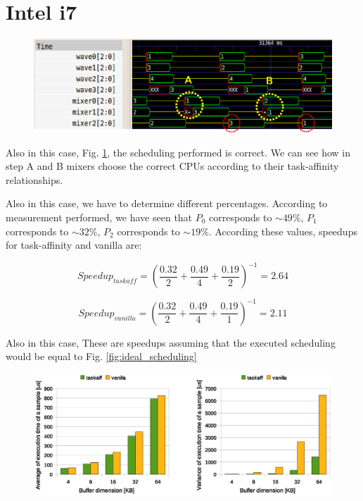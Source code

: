 \section{Intel i7}

\begin{figure}[htbp]
\centering
\includegraphics[width=\widefigure]{images/results_i7/final_i7.eps}
\caption{}
\label{fig:trace_i7}
\end{figure}

Also in this case, Fig. \ref{fig:trace_i7}, the scheduling performed is correct. We can see how in step A and B mixers choose the correct CPUs according to
their task-affinity relationships.

Also in this case, we have to determine different percentages. According to measurement performed, we have seen that $P_{0}$ corresponds to $\sim 49\%$, 
$P_{1}$ corresponds to $\sim 32\%$, $P_{2}$ corresponds to $\sim 19\%$. According these values, speedups for task-affinity and vanilla are:

\begin{equation}
  Speedup_{taskaff} = \left(\frac{0.32}{2} + \frac{0.49}{4} + \frac{0.19}{2} \right)^{-1} = 2.64
\label{eq:speedup_i7_taskaff}
\end{equation}

\begin{equation}
  Speedup_{vanilla} = \left(\frac{0.32}{2} + \frac{0.49}{4} + \frac{0.19}{1} \right)^{-1} = 2.11
\label{eq:speedup_i7_van}
\end{equation}

Also in this case, These are speedups assuming that the executed scheduling would be equal to Fig. \ref{fig:ideal_scheduling}

\begin{figure}[htbp]
\centering
\includegraphics[width=\widefigure]{images/results_i7/time_avg_var_i7.eps}
\caption{}
\label{fig:time_avg_var_i7}
\end{figure}

